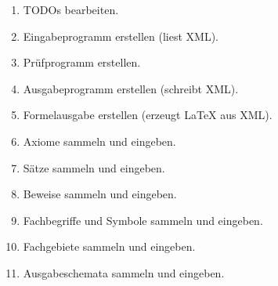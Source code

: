 \begin{enumerate}
	\item TODOs bearbeiten.
	\item Eingabeprogramm erstellen (liest XML).
	\item Prüfprogramm erstellen.
	\item Ausgabeprogramm erstellen (schreibt XML).
	\item Formelausgabe erstellen (erzeugt \LaTeX{} aus XML).
	\item Axiome sammeln und eingeben.
	\item Sätze sammeln und eingeben.
	\item Beweise sammeln und eingeben.
	\item Fachbegriffe und Symbole sammeln und eingeben.
	\item Fachgebiete sammeln und eingeben.
	\item Ausgabeschemata sammeln und eingeben.
\end{enumerate}

\Endchapter
